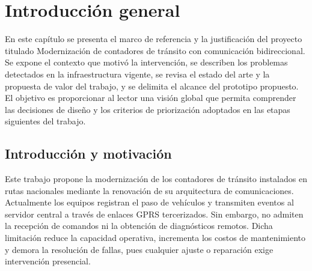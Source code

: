 
\chapter{Introducción general} %

\label{Chapter1} %
\label{IntroGeneral}


\newcommand{\keyword}[1]{\textbf{#1}}
\newcommand{\tabhead}[1]{\textbf{#1}}
\newcommand{\code}[1]{\texttt{#1}}
\newcommand{\file}[1]{\texttt{\bfseries#1}}
\newcommand{\option}[1]{\texttt{\itshape#1}}
\newcommand{\grados}{$^{\circ}$}

En este capítulo se presenta el marco de referencia y la justificación del proyecto titulado Modernización de contadores de tránsito con comunicación bidireccional. Se expone el contexto que motivó la intervención, se describen los problemas detectados en la infraestructura vigente, se revisa el estado del arte y la propuesta de valor del trabajo, y se delimita el alcance del prototipo propuesto. El objetivo es proporcionar al lector una visión global que permita comprender las decisiones de diseño y los criterios de priorización adoptados en las etapas siguientes del trabajo.


\newpage

\section{Introducción y motivación}

Este trabajo propone la modernización de los contadores de tránsito instalados en rutas nacionales mediante la renovación de su arquitectura de comunicaciones. Actualmente los equipos registran el paso de vehículos y transmiten eventos al servidor central a través de enlaces GPRS tercerizados. Sin embargo, no admiten la recepción de comandos ni la obtención de diagnósticos remotos. Dicha limitación reduce la capacidad operativa, incrementa los costos de mantenimiento y demora la resolución de fallas, pues cualquier ajuste o reparación exige intervención presencial.

